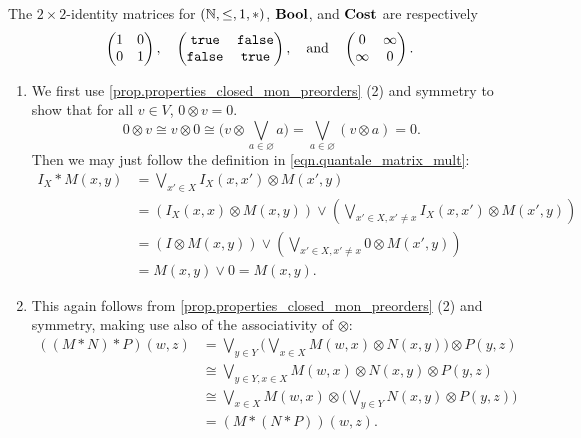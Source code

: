 \documentclass[7Sketches]{subfiles}
\begin{document}
{
The $2 \times 2$-identity matrices for $(\mathbb{N},\leq,1,*)$, $\mathbf{Bool}$, and $\mathbf{Cost}$ are respectively
  \[
    \begin{pmatrix}
  1&0\\
  0&1
\end{pmatrix},
\quad
\begin{pmatrix}
  \mathtt{true}&\mathtt{false}\\
  \mathtt{false}&\mathtt{true}
\end{pmatrix},
\quad
\mbox{and}
\quad
\begin{pmatrix}
  0&\infty\\
  \infty&0
\end{pmatrix}.
\]
}

{
\begin{enumerate}
\item We first use \cref{prop.properties_closed_mon_preorders} (2) and symmetry to
show that for all $v \in V$, $0 \otimes v = 0$.
\[
0 \otimes v \cong v \otimes 0 \cong \bigg(v \otimes \bigvee_{a \in \varnothing}
a\bigg) = \bigvee_{a \in \varnothing} (v \otimes a) = 0.
\]
Then we may just follow the definition in \cref{eqn.quantale_matrix_mult}:
\begin{align*}
I_X\ast M(x,y) &= \bigvee_{x' \in X} I_X(x,x') \otimes M(x',y) \\
&= \left(I_X(x,x) \otimes M(x,y)\right) \vee \left(\bigvee_{x' \in X, x' \ne x}I_X(x,x')
\otimes M(x',y) \right) \\
&= \left(I \otimes M(x,y)\right) \vee \left(\bigvee_{x'\in X, x'\ne x} 0 \otimes
M(x',y)\right) \\
&= M(x,y) \vee 0 = M(x,y).
\end{align*}
\item This again follows from \cref{prop.properties_closed_mon_preorders} (2) and
symmetry, making use also of the associativity of $\otimes$:
\begin{align*}
((M\ast N) \ast P)(w,z) &= \bigvee_{y \in Y} \bigg(\bigvee_{x \in X} M(w,x)
\otimes N(x,y)\bigg) \otimes P(y,z) \\
&\cong \bigvee_{y \in Y,x \in X} M(w,x) \otimes N(x,y) \otimes P(y,z) \\
&\cong \bigvee_{x \in X} M(w,x) \otimes \bigg(\bigvee_{y \in Y} N(x,y) \otimes
P(y,z) \bigg) \\
&= (M \ast(N \ast P))(w,z).
\end{align*}
\end{enumerate}
}
\end{document}
